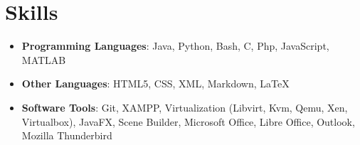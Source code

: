 \documentclass[letterpaper,11pt]{article}
\makeatletter
\newcommand{\resumeItem}[2]{
  \item\small{
    \textbf{#1}{: #2 \vspace{-2pt}}
  }
}
\newcommand{\resumeSubheading}[4]{
  \vspace{-1pt}\item
    \begin{tabular*}{0.97\textwidth}{l@{\extracolsep{\fill}}r}
      \textbf{#1} & #2 \\
      \textit{\small#3} & \textit{\small #4} \\
    \end{tabular*}\vspace{-5pt}
}
\newcommand{\resumeSubItem}[2]{\resumeItem{#1}{#2}\vspace{-4pt}}
\newcommand{\resumeSubHeadingListStart}{\begin{itemize}[leftmargin=*]}
\newcommand{\resumeSubHeadingListEnd}{\end{itemize}}
\newcommand{\resumeItemListStart}{\begin{itemize}}
\newcommand{\resumeItemListEnd}{\end{itemize}\vspace{-5pt}}
\makeatother
\begin{document}
\begin{comment}
\section{Experience}
  \resumeSubHeadingListStart

    \resumeSubheading
      {Company}{Location}
      {Position}{From - To}
      \resumeItemListStart
        \resumeItem{Technology you worked with/on}
          {Description}
        \resumeItem{Other technology you worked with/on}
          {Description}
      \resumeItemListEnd

    \resumeSubheading
      {Other Company}{Location}
      {Position}{From - To}
      \resumeItemListStart
        \resumeItem{Technology you worked with/on}
          {Description}
        \resumeItem{Other technology you worked with/on}
          {Description}
      \resumeItemListEnd

    \resumeSubheading
      {Research Position}{Location}
      {Position}{From - To}
      \resumeItemListStart
        \resumeItem{Technology you worked with/on}
          {Description}
        \resumeItem{Other technology you worked with/on}
          {Description}
      \resumeItemListEnd

  \resumeSubHeadingListEnd


\section{Projects}
  \resumeSubHeadingListStart
    \resumeSubItem{\href{link-to-my-project}{My Awesome Project}}
      {Short explanation}
    \resumeSubItem{\href{link-to-my-project}{My Awesome Project}}
      {Short explanation}
    \resumeSubItem{\href{link-to-my-project}{My Awesome Project}}
      {Short explanation}
    \resumeSubItem{\href{link-to-my-project}{My Awesome Project}}
      {Short explanation}
  \resumeSubHeadingListEnd
\end{comment}
%
\section{Skills}
 \resumeSubHeadingListStart
   \item{
     \textbf{Programming Languages}{: Java, Python, Bash, C, Php, JavaScript, MATLAB}
     \hfill
     }
     \item{
     \textbf{Other Languages}{: HTML5, CSS, XML, Markdown, LaTeX}
     \hfill
     }
     \item{
     \textbf{Software Tools}{: Git, XAMPP, Virtualization (Libvirt, Kvm, Qemu, Xen, Virtualbox), JavaFX, Scene Builder, Microsoft Office, Libre Office, Outlook, Mozilla Thunderbird}
     \hfill
     }
 \resumeSubHeadingListEnd
\end{document}

